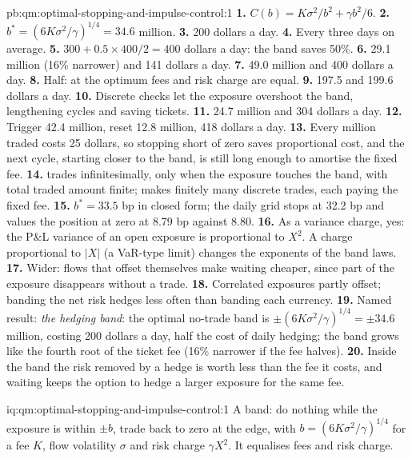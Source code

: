 \begin{solution}{pb:qm:optimal-stopping-and-impulse-control:1}
\textbf{1.} $C(b) = K\sigma^2/b^2 + \gamma b^2/6$.
\textbf{2.} $b^* = (6K\sigma^2/\gamma)^{1/4} = 34.6$ million.
\textbf{3.} 200 dollars a day.
\textbf{4.} Every three days on average.
\textbf{5.} $300 + 0.5 \times 400/2 = 400$ dollars a day: the band saves 50\%.
\textbf{6.} 29.1 million (16\% narrower) and 141 dollars a day.
\textbf{7.} 49.0 million and 400 dollars a day.
\textbf{8.} Half: at the optimum fees and risk charge are equal.
\textbf{9.} 197.5 and 199.6 dollars a day.
\textbf{10.} Discrete checks let the exposure overshoot the band, lengthening cycles and saving tickets.
\textbf{11.} 24.7 million and 304 dollars a day.
\textbf{12.} Trigger 42.4 million, reset 12.8 million, 418 dollars a day.
\textbf{13.} Every million traded costs 25 dollars, so stopping short of zero saves proportional cost, and the next cycle, starting
closer to the band, is still long enough to amortise the fixed fee.
\textbf{14.}  trades infinitesimally, only when the exposure touches the band, with total traded amount finite;  makes finitely many discrete trades, each paying the fixed fee.
\textbf{15.} $b^* = 33.5$ bp in closed form; the daily grid stops at 32.2 bp and values the position at zero at 8.79 bp against 8.80.
\textbf{16.} As a variance charge, yes: the P\&L variance of an open exposure is proportional to $X^2$. A charge proportional to $|X|$ (a
VaR-type limit) changes the exponents of the band laws.
\textbf{17.} Wider: flows that offset themselves make waiting cheaper, since part of the exposure disappears without a trade.
\textbf{18.} Correlated exposures partly offset; banding the net risk hedges less often than banding each currency.
\textbf{19.} Named result: \emph{the hedging band}: the optimal no-trade band is $\pm(6K\sigma^2/\gamma)^{1/4} = \pm 34.6$ million, costing 200 dollars a day,
half the cost of daily hedging; the band grows like the fourth root of the ticket fee (16\% narrower if the fee halves).
\textbf{20.} Inside the band the risk removed by a hedge is worth less than the fee it costs, and waiting keeps the option to hedge a
larger exposure for the same fee.
\end{solution}

\begin{solution}{iq:qm:optimal-stopping-and-impulse-control:1}
A band: do nothing while the exposure is within $\pm b$, trade back to zero at the edge, with $b = (6K\sigma^2/\gamma)^{1/4}$ for a fee $K$, flow
volatility $\sigma$ and risk charge $\gamma X^2$. It equalises fees and risk charge.
\end{solution}

